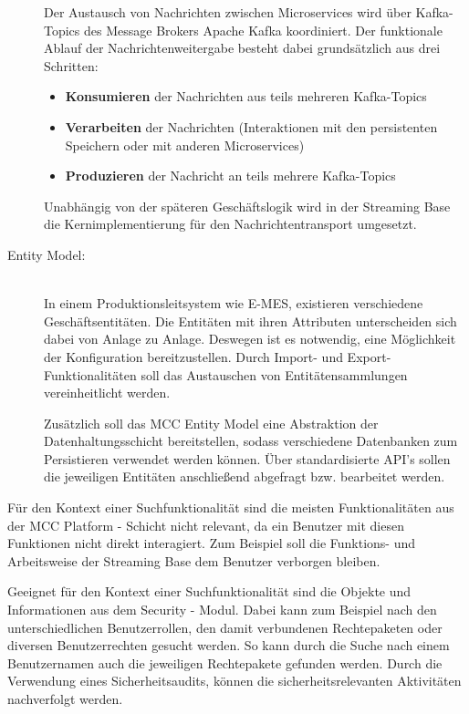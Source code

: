 \begin{description}
    Der Austausch von Nachrichten zwischen Microservices wird über Kafka-Topics des Message Brokers \glqq Apache Kafka\grqq{} koordiniert. Der funktionale Ablauf der Nachrichtenweitergabe besteht dabei grundsätzlich aus drei Schritten:

    \begin{itemize}
        \item \textbf{Konsumieren} der Nachrichten aus teils mehreren Kafka-Topics
        \item \textbf{Verarbeiten} der Nachrichten (Interaktionen mit den persistenten Speichern oder mit anderen Microservices)
        \item \textbf{Produzieren} der Nachricht an teils mehrere Kafka-Topics
    \end{itemize}

    Unabhängig von der späteren Geschäftslogik wird in der \glqq Streaming Base\grqq{} die Kernimplementierung für den Nachrichtentransport umgesetzt.
    
    \item[Entity Model:]\hfill \\
    In einem Produktionsleitsystem wie \glqq E-MES\grqq{}, existieren verschiedene Geschäftsentitäten. Die Entitäten mit ihren Attributen unterscheiden sich dabei von Anlage zu Anlage. Deswegen ist es notwendig, eine Möglichkeit der Konfiguration bereitzustellen. Durch Import- und Export-Funktionalitäten soll das Austauschen von Entitätensammlungen vereinheitlicht werden.

    Zusätzlich soll das MCC Entity Model eine Abstraktion der Datenhaltungsschicht bereitstellen, sodass verschiedene Datenbanken zum Persistieren verwendet werden können. Über standardisierte API's sollen die jeweiligen Entitäten anschließend abgefragt bzw. bearbeitet werden.


\end{description}

Für den Kontext einer Suchfunktionalität sind die meisten Funktionalitäten aus der \glqq MCC Platform\grqq{} - Schicht nicht relevant, da ein Benutzer mit diesen Funktionen nicht direkt interagiert. Zum Beispiel soll die Funktions- und Arbeitsweise der \glqq Streaming Base\grqq{} dem Benutzer verborgen bleiben.

Geeignet für den Kontext einer Suchfunktionalität sind die Objekte und Informationen aus dem \glqq Security\grqq{} - Modul. Dabei kann zum Beispiel nach den unterschiedlichen Benutzerrollen, den damit verbundenen Rechtepaketen oder diversen Benutzerrechten gesucht werden. So kann durch die Suche nach einem Benutzernamen auch die jeweiligen Rechtepakete gefunden werden. Durch die Verwendung eines Sicherheitsaudits, können die sicherheitsrelevanten Aktivitäten nachverfolgt werden.

